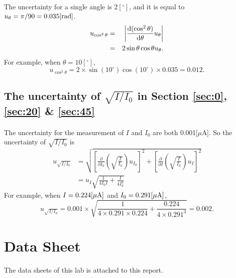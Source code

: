 \documentclass{my_template}
\begin{document}
    \paragraph{} The uncertainty for a single angle is 2$[^\circ]$, and it is equal to $u_\theta=\pi/90=0.035[\rm rad]$. 
    \begin{eqnarray*}
        u_{\cos^2\theta}&=&\left|{\rm \frac{d(\cos^2\theta)}{d\theta}}u_\theta\right|\\
        &=&2\sin\theta\cos\theta u_\theta.
    \end{eqnarray*}
    For example, when $\theta=10[^\circ]$, $$u_{\cos^2\theta}=2\times \sin(10^\circ)\cos(10^\circ)\times 0.035=0.012.$$
    \subsection{The uncertainty of $\sqrt{I/I_0}$ in Section \ref{sec:0}, \ref{sec:20} \& \ref{sec:45}}
    \paragraph{} The uncertainty for the measurement of $I$ and $I_0$ are both 0.001[$\mu$A]. So the uncertainty of $\sqrt{I/I_0}$ is 
    \begin{equation*}
        \begin{split}
            u_{\sqrt{I/I_0}}&=\sqrt{\left[\frac{\partial}{\partial I_0}\left(\sqrt{\frac{I}{I_0}}\right)u_{I_0}\right]^2+\left[\frac{\partial}{\partial I}\left(\sqrt{\frac{I}{I_0}}\right)u_{I}\right]^2}\\
            &=u_I\sqrt{\frac{1}{4I_0I}+\frac{I}{4I_0^3}}
        \end{split}
    \end{equation*}
    For example, when $I=0.224[\mu\rm A]$ and $I_0=0.291[\mu \rm A]$, $$u_{\sqrt{I/I_0}}=0.001\times \sqrt{\frac{1}{4\times 0.291\times 0.224}+\frac{0.224}{4\times 0.291^3}}=0.002.$$
    \section{Data Sheet}
    \paragraph{} The data sheets of this lab is attached to this report.
\end{document}
